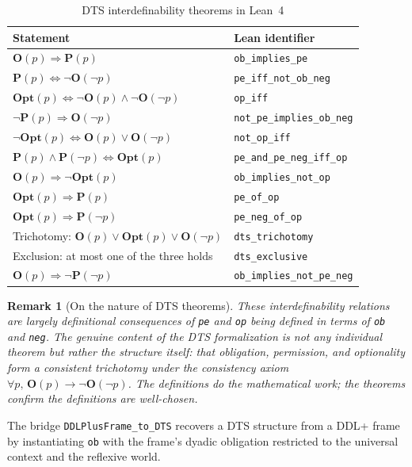 \documentclass[]{article}
\newtheorem{remark}[theorem]{Remark}
\newcommand{\code}[1]{\texttt{#1}}
\newcommand{\OB}{\ensuremath{\mathbf{O}}}
\newcommand{\PE}{\ensuremath{\mathbf{P}}}
\newcommand{\OP}{\ensuremath{\mathbf{Opt}}}
\newcommand{\DDL}{\textup{DDL+}}
\newcommand{\DTS}{\textup{DTS}}
\begin{document}
\begin{longtable}{ll}
\caption{DTS interdefinability theorems in Lean~4}\label{tab:dts}\\
\textbf{Statement} & \textbf{Lean identifier} \\
\hline
$\OB(p) \Rightarrow \PE(p)$ & \code{ob\_implies\_pe} \\
$\PE(p) \Leftrightarrow \neg\OB(\neg p)$ & \code{pe\_iff\_not\_ob\_neg} \\
$\OP(p) \Leftrightarrow \neg\OB(p) \wedge \neg\OB(\neg p)$ & \code{op\_iff} \\
$\neg\PE(p) \Rightarrow \OB(\neg p)$ & \code{not\_pe\_implies\_ob\_neg} \\
$\neg\OP(p) \Leftrightarrow \OB(p) \vee \OB(\neg p)$ & \code{not\_op\_iff} \\
$\PE(p) \wedge \PE(\neg p) \Leftrightarrow \OP(p)$ & \code{pe\_and\_pe\_neg\_iff\_op} \\
$\OB(p) \Rightarrow \neg\OP(p)$ & \code{ob\_implies\_not\_op} \\
$\OP(p) \Rightarrow \PE(p)$ & \code{pe\_of\_op} \\
$\OP(p) \Rightarrow \PE(\neg p)$ & \code{pe\_neg\_of\_op} \\
Trichotomy: $\OB(p) \vee \OP(p) \vee \OB(\neg p)$ & \code{dts\_trichotomy} \\
Exclusion: at most one of the three holds & \code{dts\_exclusive} \\
$\OB(p) \Rightarrow \neg\PE(\neg p)$ & \code{ob\_implies\_not\_pe\_neg} \\
\hline
\end{longtable}

\begin{remark}[On the nature of DTS theorems]
These interdefinability relations are largely definitional consequences of
\code{pe} and \code{op} being defined in terms of \code{ob} and \code{neg}.
The genuine content of the \DTS{} formalization is not any individual theorem
but rather the \emph{structure} itself: that obligation, permission, and
optionality form a consistent trichotomy under the consistency axiom
$\forall p,\, \OB(p) \to \neg \OB(\neg p)$.
The definitions do the mathematical work; the theorems confirm the
definitions are well-chosen.
\end{remark}

\noindent
The bridge \code{DDLPlusFrame\_to\_DTS} recovers a \DTS{} structure from a
\DDL{} frame by instantiating \code{ob} with the frame's dyadic obligation
restricted to the universal context and the reflexive world.
\end{document}
